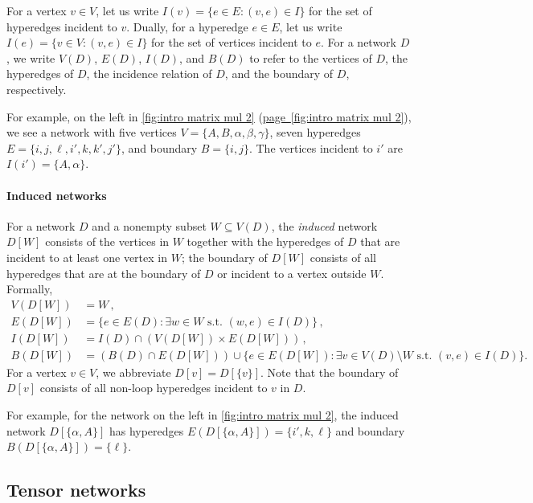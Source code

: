 \documentclass[11pt]{article}
\numberwithin{equation}{section}
\theoremstyle{definition}
\theoremstyle{plain}
\newcommand{\expref}[2]{\hyperref[#2]{#1~\ref{#2}}}
\begin{document}
For a vertex $v\in V$, let us write $I(v)=\{e\in E:(v,e)\in I\}$
for the set of hyperedges incident to $v$. Dually, for a hyperedge $e\in E$, let
us write $I(e)=\{v\in V:(v,e)\in I\}$ for the set of vertices incident to $e$.
For a network $D$, we write $V(D)$, $E(D)$, $I(D)$, and $B(D)$ to
refer to the vertices of $D$, the hyperedges of $D$, the incidence relation
of $D$, and the boundary of $D$, respectively.

For example, on the left in \eqref{fig:intro matrix mul 2} (\expref{page}{fig:intro matrix mul 2}),
we see a network with five vertices $V = \{A, B, \alpha, \beta, \gamma\}$,
seven hyperedges $E = \{i, j, \ell, i', k, k', j'\}$, and boundary $B =
\{i, j\}$.  The vertices incident to $i'$ are $I(i') = \{A, \alpha\}$.

\paragraph*{Induced networks}
For a network $D$ and a nonempty subset $W\subseteq V(D)$,
the \emph{induced} network $D[W]$ consists of the vertices in $W$ together with the hyperedges of
$D$ that are incident to at least one vertex in $W$; the boundary of
$D[W]$ consists of all hyperedges that are at the boundary of $D$
or incident to a vertex outside $W$.  Formally,
\begin{equation}
\label{eq:induced}
\begin{aligned}
  V(D[W])&=W\,,\\
  E(D[W])&=\{e\in E(D):\text{$\exists w \in W$ s.t.~$(w,e)\in I(D)$}\}\,,\\
  I(D[W])&=I(D)\cap\left(V(D[W])\times E(D[W])\right)\,,\\
  B(D[W])&=\left(B(D)\cap E(D[W])\right)\cup
  \{e\in E(D[W])\!:\text{$\exists v \in V(D) \!\setminus\! W$ s.t.~$(v,e)\in I(D)$}\}.
\end{aligned}
\end{equation}
For a vertex $v\in V$, we abbreviate $D[v]=D[\{v\}]$.
Note that the boundary of $D[v]$ consists of all non-loop
hyperedges incident to $v$ in $D$.

For example, for the network on the left in \eqref{fig:intro matrix
  mul 2}, the induced network $D[\{\alpha, A\}]$ has hyperedges $E(D[\{\alpha, A\}]) = \{i',k, \ell\}$ and boundary $B(D[\{\alpha,A\}]) = \{\ell\}$.

\subsection{Tensor networks}
\end{document}
